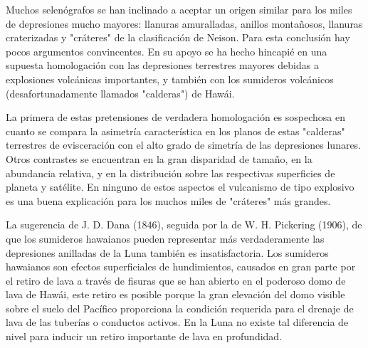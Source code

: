 \documentclass[12pt]{article}
\begin{document}
Muchos selenógrafos se han inclinado a 
aceptar un origen similar para los miles de 
depresiones mucho mayores: llanuras amuralladas, anillos montañosos, 
llanuras craterizadas y "cráteres" de la clasificación de Neison. 
Para esta conclusión hay pocos argumentos 
convincentes. En su apoyo se ha hecho hincapié 
en una supuesta homologación con las 
depresiones terrestres mayores debidas a explosiones volcánicas importantes, 
y también con los sumideros volcánicos 
(desafortunadamente llamados "calderas") de 
Hawái. 

La primera de estas pretensiones de verdadera homologación es 
sospechosa en cuanto se compara la 
asimetría característica en los planos de estas "calderas" 
terrestres de evisceración con el alto grado de simetría de las depresiones 
lunares. Otros contrastes se encuentran en la gran 
disparidad de tamaño, en la abundancia relativa, y en la 
distribución sobre las respectivas superficies de 
planeta y satélite. En ninguno de estos aspectos 
el vulcanismo de tipo explosivo es una buena 
explicación para los muchos miles de "cráteres" más grandes. 

La sugerencia de J. D. Dana (1846), seguida 
por la de W. H. Pickering (1906), de que 
los sumideros hawaianos pueden representar más verdaderamente las 
depresiones anilladas de la Luna también es 
insatisfactoria. Los sumideros hawaianos son efectos superficiales 
de hundimientos, causados en gran parte por el 
retiro de lava a través de fisuras que se han 
abierto en el poderoso domo de lava de Hawái, este 
retiro es posible porque la gran 
elevación del domo visible sobre el 
suelo del Pacífico proporciona la condición requerida para el 
drenaje de lava de las tuberías o 
conductos activos. En la Luna no existe tal diferencia 
de nivel para inducir un retiro importante de lava 
en profundidad.
\end{document}

